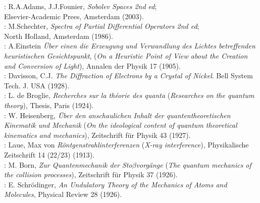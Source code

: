\documentclass[12pt]{book}
\numberwithin{equation}{chapter}
\def\n{\noindent}
\begin{document}
\n [20]: R.A.Adams, J.J.Founier, \emph{Sobolev Spaces 2nd ed};\\ 
Elsevier-Academic Prees, Amsterdam (2003).\\

\n [21]: M.Schechter, \emph{Spectra of Partial Differential Operators 2nd ed};\\ 
North Holland, Amsterdam (1986).\\

\n [22]:  A.Einstein \emph{\"Uber einen die Erzeugung und Verwandlung des Lichtes betreffenden heuristischen Gesichtspunkt}, (\emph{On a Heuristic Point of View about the Creation and Conversion of Light}),  Annalen der Physik 17 (1905).\\

\n [23]: Davisson, C.J. \emph{The Diffraction of Electrons by a Crystal of Nickel}. Bell System Tech. J. USA (1928).\\

\n [24]: L. de Broglie, \emph{Recherches sur la th\'eorie des quanta} (\emph{Researches on the quantum theory}), Thesis, Paris (1924).\\

\n [25]: W. Heisenberg, \emph{\"Uber den anschaulichen Inhalt der quantentheoretischen Kinematik und Mechanik} (\emph{On the ideological content of quantum theoretical kinematics and mechanics}), Zeitschrift f\"ur Physik 43 (1927).\\

\n [26]: Laue, Max von \emph{R\"ontgenstrahlinterferenzen} (\emph{X-ray interference}), Physikalische Zeitschrift 14 (22/23) (1913).\\

\n [27]: M. Born, \emph{Zur Quantenmechanik der Sto$\beta$vorg\"ange} (\emph{The quantum mechanics of the collision processes}), Zeitschrift f\"ur Physik 37 (1926).\\

\n [28]: E. Schr\"odinger, \emph{An Undulatory Theory of the Mechanics of Atoms and Molecules},  Physical Review 28 (1926).  
\end{document}
